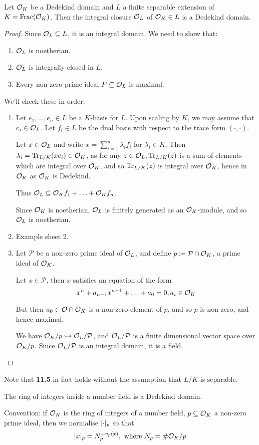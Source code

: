 \documentclass[10pt,a4paper]{article}
\begin{document}
\begin{theorem}
  Let $\mathcal{O}_K$ be a Dedekind domain and $L$ a finite separable extension of $K = \operatorname{Frac}(\mathcal{O}_K)$. Then the integral closure $\mathcal{O}_L$ of $\mathcal{O}_K \in L$ is a Dedekind domain.
\end{theorem}
\begin{proof}
  Since $\mathcal{O}_L \subseteq L$, it is an integral domain. We need to show that:
  \begin{enumerate}
    \item $\mathcal{O}_L$ is noetherian.
    \item $\mathcal{O}_L$ is integrally closed in $L$.
    \item Every non-zero prime ideal $P \subseteq \mathcal{O}_L$ is maximal.
  \end{enumerate}
  We'll check these in order:
  \begin{enumerate}
    \item Let $e_1, \ldots, e_n \in L$ be a $K$-basis for $L$. Upon scaling by $K$, we may assume that $e_i \in \mathcal{O}_L$. Let $f_i \in L$ be the dual basis with respect to the trace form $(\cdot, \cdot)$.

    Let $x \in \mathcal{O}_L$ and write $x = \sum_{i=1}^n \lambda_i f_i$ for $\lambda_i \in K$. Then $\lambda_i = \operatorname{Tr}_{L/K}(xe_i) \in \mathcal{O}_K$, as for any $z \in \mathcal{O}_L, \operatorname{Tr}_{L/K}(z)$ is a sum of elements which are integral over $\mathcal{O}_K$, and so $\operatorname{Tr}_{L/K}(z)$ is integral over $\mathcal{O}_K$, hence in $\mathcal{O}_K$ as $\mathcal{O}_K$ is Dedekind.

    Thus $\mathcal{O}_L \subseteq \mathcal{O}_K f_1 + \ldots + \mathcal{O}_K f_n$.

    Since $\mathcal{O}_K$ is noetherian, $\mathcal{O}_L$ is finitely generated as an $\mathcal{O}_K$-module, and so $\mathcal{O}_L$ is noetherian.
    \item Example sheet 2.
    \item Let $\mathcal{P}$ be a non-zero prime ideal of $\mathcal{O}_L$, and define $p \coloneqq \mathcal{P}\cap \mathcal{O}_K$, a prime ideal of $\mathcal{O}_K$.

    Let $x \in \mathcal{P}$, then $x$ satisfies an equation of the form
    \[x^n + a_{n-1}x^{n-1} + \ldots + a_0 = 0, a_i \in \mathcal{O}_K\]

    But then $a_0 \in \mathcal{O}\cap \mathcal{O}_K$ is a non-zero element of $p$, and so $p$ is non-zero, and hence maximal.

    We have $\mathcal{O}_K/p \hookrightarrow \mathcal{O}_L/\mathcal{P}$, and $\mathcal{O}_L/\mathcal{P}$ is a finite dimensional vector space over $\mathcal{O}_K/p$. Since $\mathcal{O}_L/\mathcal{P}$ is an integral domain, it is a field.
  \end{enumerate}
\end{proof}
Note that \textbf{11.5} in fact holds without the assumption that $L/K$ is separable.

\begin{corollary}
  The ring of integers inside a number field is a Dedekind domain.
\end{corollary}
Convention: if $\mathcal{O}_K$ is the ring of integers of a number field, $p \subseteq \mathcal{O}_K$ a non-zero prime ideal, then we normalise $\lvert\cdot\rvert_p$ so that
\[\lvert x\rvert_p = N_p^{-v_p(x)}, \text{ where } N_p = \#\mathcal{O}_K/p\]
\end{document}
